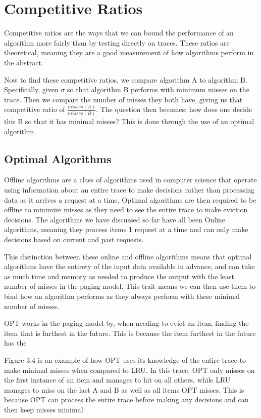 \section{Competitive Ratios}
Competitive ratios are the ways that we can bound the performance of an algorithm more fairly than by testing directly on traces. These ratios are theoretical, meaning they are a good measurement of how algorithms perform in the abstract.

Now to find these competitive ratios, we compare algorithm A to algorithm B. Specifically, given $\sigma$ so that algorithm B performs with minimum misses on the trace. Then we compare the number of misses they both have, giving us that competitive ratio of $\frac{misses(A)}{misses(B)}$. The question then becomes: how does one decide this B so that it has minimal misses? This is done through the use of an optimal algorithm.

\subsection{Optimal Algorithms}
Offline algorithms are a class of algorithms used in computer science that operate using information about an entire trace to make decisions rather than processing data as it arrives a request at a time. Optimal algorithms are then required to be offline to minimize misses as they need to see the entire trace to make eviction decisions. The algorithms we have discussed so far have all been Online algorithms, meaning they process items 1 request at a time and can only make decisions based on current and past requests. 

This distinction between these online and offline algorithms means that optimal algorithms have the entirety of the input data available in advance, and can take as much time and memory as needed to produce the output with the least number of misses in the paging model. This trait means we can then use them to bind how an algorithm performs as they always perform with these minimal number of misses. 

OPT works in the paging model by, when needing to evict an item, finding the item that is furthest in the future. This is because the item furthest in the future has the

Figure 3.4 is an example of how OPT uses its knowledge of the entire trace to make minimal misses when compared to LRU. In this trace, OPT only misses on the first instance of an item and manages to hit on all others, while LRU manages to miss on the last A and B as well as all items OPT misses. This is because OPT can process the entire trace before making any decisions and can then keep misses minimal. 

